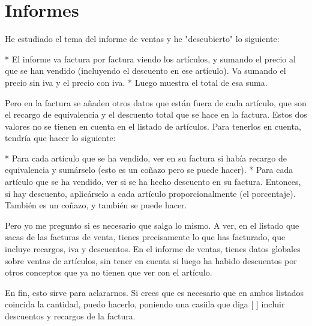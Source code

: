 \section{Informes}

He estudiado el tema del informe de ventas y he "descubierto" lo 
siguiente: 

* El informe va factura por factura viendo los artículos, y sumando el 
precio al que se han vendido (incluyendo el descuento en ese 
artículo). Va sumando el precio sin iva y el precio con iva. 
* Luego muestra el total de esa suma. 

Pero en la factura se añaden otros datos que están fuera de cada 
artículo, que son el recargo de equivalencia y el descuento total que 
se hace en la factura. Estos dos valores no se tienen en cuenta en el 
listado de artículos. Para tenerlos en cuenta, tendría que hacer lo 
siguiente: 

* Para cada artículo que se ha vendido, ver en su factura si había 
recargo de equivalencia y sumárselo (esto es un coñazo pero se puede 
hacer). 
* Para cada artículo que se ha vendido, ver si se ha hecho descuento 
en su factura. Entonces, si hay descuento, aplicárselo a cada artículo 
proporcionalmente (el porcentaje). También es un coñazo, y también se 
puede hacer. 

Pero yo me pregunto si es necesario que salga lo mismo. A ver, en el 
listado que sacas de las facturas de venta, tienes precisamente lo que 
has facturado, que incluye recargos, iva y descuentos. En el informe 
de ventas, tienes datos globales sobre ventas de artículos, sin tener 
en cuenta si luego ha habido descuentos por otros conceptos que ya no 
tienen que ver con el artículo. 

En fin, esto sirve para aclararnos. Si crees que es necesario que en 
ambos listados coincida la cantidad, puedo hacerlo, poniendo una 
casiila que diga [ ] incluir descuentos y recargos de la factura. 



